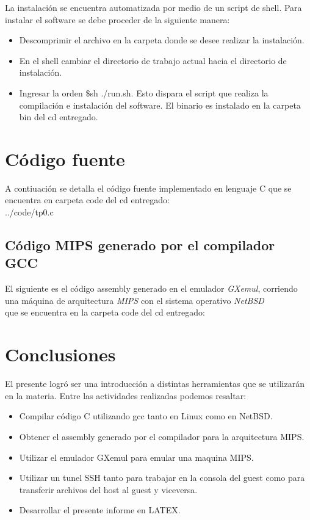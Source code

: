 \documentclass[a4paper,10pt]{article}
\begin{document}
La instalaci\'{o}n se encuentra automatizada por medio de un script de shell.
Para instalar el software se debe proceder de la siguiente manera:

\begin{itemize}
\item Descomprimir el archivo en la carpeta donde se desee realizar la instalaci\'{o}n.
\item En el shell cambiar el directorio de trabajo actual hacia el directorio de instalaci\'{o}n.
\item Ingresar la orden \$sh ./run.sh. Esto dispara el script que realiza la
compilaci\'{o}n e instalaci\'{o}n del software. El binario es instalado en la carpeta bin del cd entregado.
\end{itemize}

\newpage
\newpage

\section{C\'{o}digo fuente}
A contiuaci\'{o}n se detalla el c\'{o}digo fuente implementado en lenguaje C que se encuentra en carpeta code del cd entregado:
\lstset{basicstyle=\scriptsize, commentstyle=\textit, numbers=left, numberstyle=\footnotesize, tabsize=4, breaklines=true}\\
\lstset{language=C} 
\lstset{extendedchars=false} 
 {../code/tp0.c}

\subsection{C\'{o}digo MIPS generado por el compilador GCC}
El siguiente es el c\'{o}digo assembly generado en el emulador \textit{GXemul}, corriendo una m\'{a}quina de arquitectura \textit{MIPS} con el sistema operativo \textit{NetBSD}\\ 
que se encuentra en la carpeta code del cd entregado:
\lstset{basicstyle=\scriptsize, commentstyle=\textit, numbers=left, numberstyle=\footnotesize, tabsize=4, breaklines=true}


\newpage
\newpage

\section{Conclusiones}
El presente logr\'{o} ser una introducci\'{o}n a distintas herramientas que se utilizar\'{a}n en la materia.
Entre las actividades realizadas podemos resaltar:

\begin{itemize}
\item Compilar c\'{o}digo C utilizando gcc tanto en Linux como en NetBSD.
\item Obtener el assembly generado por el compilador para la arquitectura MIPS.
\item Utilizar el emulador GXemul para emular una maquina MIPS.
\item Utilizar un tunel SSH tanto para trabajar en la consola del guest como para transferir archivos del host al guest y viceversa.
\item Desarrollar el presente informe en LATEX.
\end{itemize}
\end{document}
